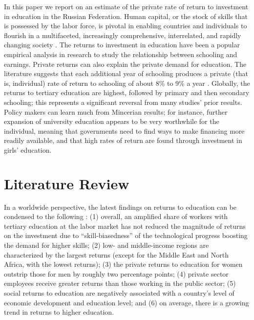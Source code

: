 \documentclass[alpha-refs]{wiley-article-01g}
\begin{document}
In this paper we report on an estimate of the private rate of return to 
investment in education in the Russian Federation. Human capital, or the 
stock of skills that is possessed by the labor force, is pivotal in 
enabling countries and individuals to flourish in a multifaceted, 
increasingly comprehensive, interrelated, and rapidly changing society 
\parencite{Schultz1972,Mincer1974,Heckman2003,Becker2009,Broecke2015}. The 
returns to investment in education have been a popular empirical analysis 
in research to study the relationship between schooling and earnings. 
Private returns can also explain the private demand for education. The 
literature suggests that each additional year of schooling produces a 
private (that is, individual) rate of return to schooling of about 8\% to 
9\%  a year 
\parencite{Psacharopoulos_Patrinos2018,Montenegro_Patrinos2014}. Globally, 
the returns to tertiary education are highest, followed by primary and then 
secondary schooling; this represents a significant reversal from many 
studies' prior results. Policy makers can learn much from Mincerian 
results; for instance, further expansion of university education appears to 
be very worthwhile for the individual, meaning that governments need to 
find ways to make financing more readily available, and that high rates of 
return are found through investment in girls' education.

\section{Literature Review}

In a worldwide perspective, the latest findings on returns to education can be condensed to the following \parencite{Psacharopoulos_Patrinos2018}: (1) overall, an amplified share of workers with tertiary education at the labor market has not reduced the magnitude of returns on the investment due to ``skill-biasedness'' of the technological progress boosting the demand for higher skills; (2) low- and middle-income regions are characterized by the largest returns (except for the Middle East and North Africa, with the lowest returns); (3) the private returns to education for women outstrip those for men by roughly two percentage points; (4) private sector employees receive greater returns than those working in the public sector; (5) social returns to education are negatively associated with a country's level of economic development and education level; and (6) on average, there is a growing trend in returns to higher education.
\end{document}
